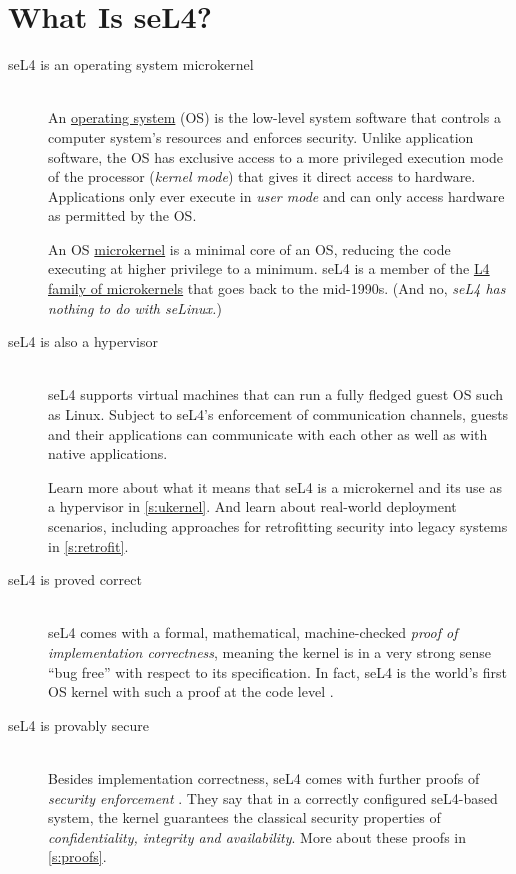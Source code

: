 \documentclass[english,a4paper,12pt\ifDraft,draft\fi]{report}
\newcommand{\Sect}[1]{\section{#1}}
\newcommand{\Sect}[1]{\chapter{#1}}
\newcommand{\Break}{\ \nopagebreak\\}
\begin{document}


  \Sect{What Is seL4?}\label{s:intro}

  \begin{description}
  \item[seL4 is an operating system microkernel]\Break
    An \href{https://en.wikipedia.org/wiki/Operating_system}{operating
      system} (OS) is the low-level system software that controls a
    computer system's resources and enforces security. Unlike
    application software, the OS has
    exclusive access to a more privileged execution mode of the processor (\emph{kernel mode})
    that gives it direct access to hardware. Applications only ever
    execute in
    \emph{user mode} and can only access hardware as permitted by the
    OS.

    An OS
    \href{https://en.wikipedia.org/wiki/Microkernel}{microkernel} is a
    minimal core of an OS, reducing the code executing at higher
    privilege to a minimum. seL4 is a member of the
    \href{https://en.wikipedia.org/wiki/L4_microkernel_family}{L4
      family of microkernels} that goes back to the mid-1990s.
    (And no, \emph{seL4 has nothing to do with seLinux.})

  \item[seL4 is also a hypervisor] \Break
    seL4 supports virtual machines that can run a fully fledged guest OS
    such as Linux. Subject to seL4's enforcement of communication
    channels,  guests and their applications can communicate with
    each other as well as with native applications.

   Learn  more about what it means that seL4 is a microkernel and its use as
    a hypervisor in \autoref{s:ukernel}. And learn about real-world
    deployment scenarios, including approaches for retrofitting security into
    legacy systems in \autoref{s:retrofit}.

  \item[seL4 is proved correct]\Break
    seL4 comes with a formal, mathematical, machine-checked
    \emph{proof of implementation correctness}, meaning the kernel is
    in a very strong sense ``bug free'' with respect to its specification.
    In fact, seL4 is the world's
    first OS kernel with such a proof at the code level
    \citep{Klein_EHA_etal_09}.

  \item[seL4 is provably secure]\Break
    Besides implementation correctness, seL4 comes with further proofs of
    \emph{security enforcement} \citep{Klein_AEMSKH_14}. They say that
    in a correctly configured seL4-based system,  the kernel
    guarantees the classical security properties of
    \emph{confidentiality, integrity and availability}. More about
    these proofs in \autoref{s:proofs}.


\end{description}
\end{document}
